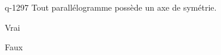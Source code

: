 \begin{truefalse}{q-1297}
Tout parallélogramme possède un axe de symétrie.
\item Vrai
\item* Faux
\end{truefalse}

